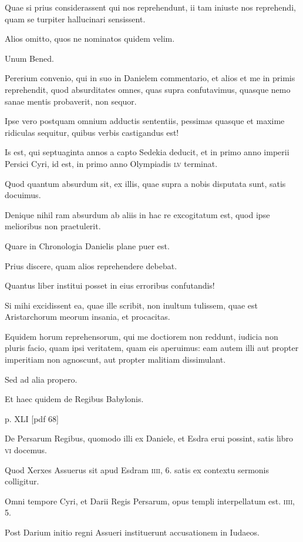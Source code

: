 \begin{parnumbers}
Quae si prius considerassent qui nos reprehendunt,
ii tam iniuste nos reprehendi, quam se turpiter hallucinari
sensissent.

Alios omitto, quos ne nominatos quidem velim.

Unum Bened.

Pererium convenio, qui in suo in Danielem commentario,
et alios et me in primis reprehendit, quod absurditates
omnes, quas supra confutavimus, quasque nemo sanae mentis
probaverit, non sequor.

Ipse vero postquam omnium adductis sententiis,
pessimas quasque et maxime ridiculas sequitur, quibus verbis
castigandus est!

Is est, qui septuaginta annos a capto Sedekia
deducit, et in primo anno imperii Persici Cyri, id est, in primo
anno Olympiadis \textsc{lv} terminat.

Quod quantum absurdum sit, ex
illis, quae supra a nobis disputata sunt, satis docuimus.

Denique
nihil ram absurdum ab aliis in hac re excogitatum est, quod ipse
melioribus non praetulerit.

Quare in Chronologia Danielis plane
puer est.

Prius discere, quam alios reprehendere debebat.

Quantus liber institui posset in eius erroribus confutandis!

Si mihi excidissent
ea, quae ille scribit, non inultum tulissem, quae est Aristarchorum
meorum insania, et procacitas.

Equidem horum reprehensorum,
qui me doctiorem non reddunt, iudicia non pluris
facio, quam ipsi veritatem, quam eis aperuimus: eam autem illi aut
propter imperitiam non agnoscunt, aut propter malitiam dissimulant.

Sed ad alia propero.

Et haec quidem de Regibus Babylonis.

\clearpage
p. XLI [pdf 68]

De Persarum Regibus, quomodo illi ex Daniele, et Esdra erui possint,
satis libro \textsc{vi} docemus.

Quod Xerxes Assuerus sit apud Esdram
\textsc{iiii}, 6. satis ex contextu sermonis colligitur.

Omni tempore
Cyri, et Darii Regis Persarum, opus templi interpellatum est.
\textsc{iiii}, 5.

Post Darium initio regni Assueri instituerunt accusationem
in Iudaeos.


\end{parnumbers}
